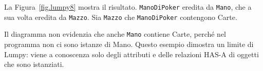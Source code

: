 \documentclass[10pt]{book}
\begin{document}
La Figura~\ref{fig.lumpy8} mostra il risultato.  
{\tt ManoDiPoker} eredita da {\tt Mano}, che a sua volta eredita da {\tt Mazzo}.
Sia {\tt Mazzo} che {\tt ManoDiPoker} contengono Carte.

Il diagramma non evidenzia che anche  {\tt Mano} contiene Carte, perché nel programma non ci sono istanze di Mano. Questo esempio dimostra un limite di Lumpy: viene a conoscenza solo degli attributi e delle relazioni HAS-A di oggetti che sono istanziati.

\printindex

\clearemptydoublepage
\end{document}
